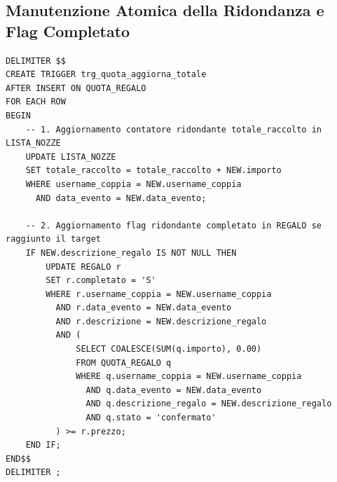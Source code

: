 \subsection{Manutenzione Atomica della Ridondanza e Flag Completato}
\begin{lstlisting}
DELIMITER $$
CREATE TRIGGER trg_quota_aggiorna_totale
AFTER INSERT ON QUOTA_REGALO
FOR EACH ROW
BEGIN
    -- 1. Aggiornamento contatore ridondante totale_raccolto in LISTA_NOZZE
    UPDATE LISTA_NOZZE
    SET totale_raccolto = totale_raccolto + NEW.importo
    WHERE username_coppia = NEW.username_coppia
      AND data_evento = NEW.data_evento;

    -- 2. Aggiornamento flag ridondante completato in REGALO se raggiunto il target
    IF NEW.descrizione_regalo IS NOT NULL THEN
        UPDATE REGALO r
        SET r.completato = 'S'
        WHERE r.username_coppia = NEW.username_coppia
          AND r.data_evento = NEW.data_evento
          AND r.descrizione = NEW.descrizione_regalo
          AND (
              SELECT COALESCE(SUM(q.importo), 0.00)
              FROM QUOTA_REGALO q
              WHERE q.username_coppia = NEW.username_coppia
                AND q.data_evento = NEW.data_evento
                AND q.descrizione_regalo = NEW.descrizione_regalo
                AND q.stato = 'confermato'
          ) >= r.prezzo;
    END IF;
END$$
DELIMITER ;
\end{lstlisting}
